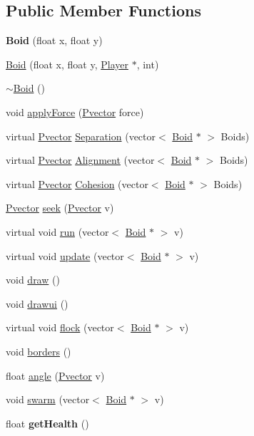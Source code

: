 \subsection*{Public Member Functions}
\begin{DoxyCompactItemize}
\item 
{\bfseries Boid} (float x, float y)\hypertarget{class_boid_a61c7081f12c16ba99dc4b3c094195bb2}{}\label{class_boid_a61c7081f12c16ba99dc4b3c094195bb2}

\item 
\hyperlink{class_boid_a809353c5168106191f3fa0c0841eb83e}{Boid} (float x, float y, \hyperlink{class_player}{Player} $\ast$, int)
\item 
\hyperlink{class_boid_a712f84ddc1b8ad06ad7ecd6c10a1666c}{$\sim$\+Boid} ()
\item 
void \hyperlink{class_boid_acef10e100c27b76f6b867ae7468c09bb}{apply\+Force} (\hyperlink{class_pvector}{Pvector} force)
\item 
virtual \hyperlink{class_pvector}{Pvector} \hyperlink{class_boid_a88b4b07542a7c340df58f10fc1516666}{Separation} (vector$<$ \hyperlink{class_boid}{Boid} $\ast$ $>$ Boids)
\item 
virtual \hyperlink{class_pvector}{Pvector} \hyperlink{class_boid_a9db5db2460a2fed2006740bebae9e15f}{Alignment} (vector$<$ \hyperlink{class_boid}{Boid} $\ast$ $>$ Boids)
\item 
virtual \hyperlink{class_pvector}{Pvector} \hyperlink{class_boid_af566a172498e7019687316c2ccf111a9}{Cohesion} (vector$<$ \hyperlink{class_boid}{Boid} $\ast$ $>$ Boids)
\item 
\hyperlink{class_pvector}{Pvector} \hyperlink{class_boid_a3135a25087ac386d92e28b5718f6504f}{seek} (\hyperlink{class_pvector}{Pvector} v)
\item 
virtual void \hyperlink{class_boid_a61f243a032aafc4fdbcfe8a4b29ba22f}{run} (vector$<$ \hyperlink{class_boid}{Boid} $\ast$ $>$ v)
\item 
virtual void \hyperlink{class_boid_aba6608b5a1645b4812cc895aff338606}{update} (vector$<$ \hyperlink{class_boid}{Boid} $\ast$ $>$ v)
\item 
void \hyperlink{class_boid_a07b641cc0b78b95fa38d862dd173b05b}{draw} ()
\item 
void \hyperlink{class_boid_a420a63dc83217c22eb0937d57a6c197e}{drawui} ()
\item 
virtual void \hyperlink{class_boid_a6bbef162cb1a5439a4b02464c79f7e1f}{flock} (vector$<$ \hyperlink{class_boid}{Boid} $\ast$ $>$ v)
\item 
void \hyperlink{class_boid_ab297036090d8dad9e70379ecfeb60137}{borders} ()
\item 
float \hyperlink{class_boid_afeb7353f3946b4bd1072a14aee888770}{angle} (\hyperlink{class_pvector}{Pvector} v)
\item 
void \hyperlink{class_boid_a2cbcd088c7dbe32f5103325cd5cfc3d3}{swarm} (vector$<$ \hyperlink{class_boid}{Boid} $\ast$ $>$ v)
\item 
float {\bfseries get\+Health} ()\hypertarget{class_boid_ac98a6ee214e20502c895c4601b755322}{}\label{class_boid_ac98a6ee214e20502c895c4601b755322}


\end{DoxyCompactItemize}
